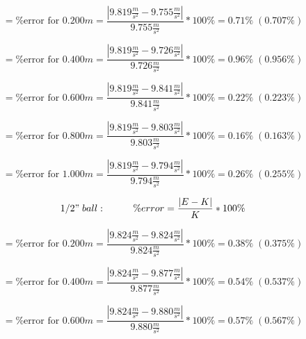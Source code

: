 \begin{equation*}
  = \text{\%error for 0.200$m$} = \frac{|9.819\frac{m}{s^2} - 9.755\frac{m}{s^2}|}{9.755\frac{m}{s^2}} * 100\% = 0.71\% \; (0.707\%)
\end{equation*}

\begin{equation*}
  = \text{\%error for 0.400$m$} = \frac{|9.819\frac{m}{s^2} - 9.726\frac{m}{s^2}|}{9.726\frac{m}{s^2}} * 100\% = 0.96\% \; (0.956\%)
\end{equation*}

\begin{equation*}
  = \text{\%error for 0.600$m$} = \frac{|9.819\frac{m}{s^2} - 9.841\frac{m}{s^2}|}{9.841\frac{m}{s^2}} * 100\% = 0.22\% \; (0.223\%)
\end{equation*}

\begin{equation*}
  = \text{\%error for 0.800$m$} = \frac{|9.819\frac{m}{s^2} - 9.803\frac{m}{s^2}|}{9.803\frac{m}{s^2}} * 100\% = 0.16\% \; (0.163\%)
\end{equation*}

\begin{equation*}
  = \text{\%error for 1.000$m$} = \frac{|9.819\frac{m}{s^2} - 9.794\frac{m}{s^2}|}{9.794\frac{m}{s^2}} * 100\% = 0.26\% \; (0.255\%)
\end{equation*}


\begin{equation*}
  1/2" \; ball: \hspace{1cm} \%error = \frac{|E - K|}{K} * 100\%
\end{equation*}

\begin{equation*}
  = \text{\%error for 0.200$m$} = \frac{|9.824\frac{m}{s^2} - 9.824\frac{m}{s^2}|}{9.824\frac{m}{s^2}} * 100\% = 0.38\% \; (0.375\%)
\end{equation*}

\begin{equation*}
  = \text{\%error for 0.400$m$} = \frac{|9.824\frac{m}{s^2} - 9.877\frac{m}{s^2}|}{9.877\frac{m}{s^2}} * 100\% = 0.54\% \; (0.537\%)
\end{equation*}

\begin{equation*}
  = \text{\%error for 0.600$m$} = \frac{|9.824\frac{m}{s^2} - 9.880\frac{m}{s^2}|}{9.880\frac{m}{s^2}} * 100\% = 0.57\% \; (0.567\%)
\end{equation*}

